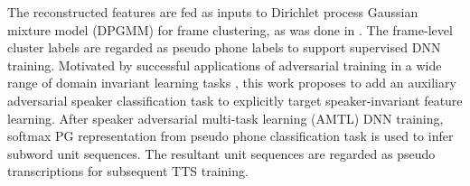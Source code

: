 \documentclass[a4paper]{article}
\begin{document}
The  reconstructed features are fed as inputs to Dirichlet process Gaussian mixture model (DPGMM) \cite{chang2013parallel} for frame clustering, as was done in \cite{chen2015parallel}. 
The frame-level cluster labels are regarded as pseudo phone   labels to support supervised DNN training. Motivated by successful applications of adversarial training \cite{ganin2015unsupervised} in a wide range of   domain invariant learning tasks \cite{sun2017unsupvised,meng2018speaker,yi2019language,peng2019adversarial}, this work proposes to add an auxiliary adversarial speaker classification task  to explicitly target speaker-invariant feature learning.
After speaker adversarial multi-task learning (AMTL) DNN training, 
softmax PG representation from pseudo phone classification task is used to infer subword unit sequences.
The resultant unit sequences are regarded as pseudo transcriptions for subsequent TTS training.
\end{document}
